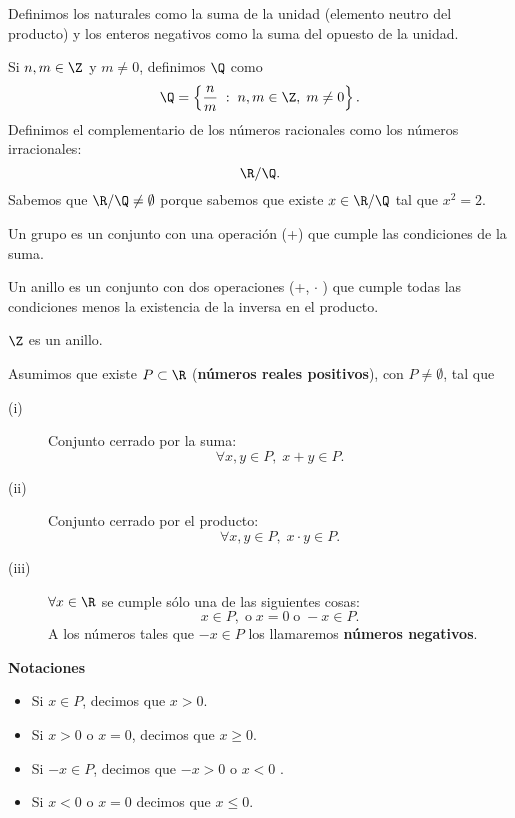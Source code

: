 Definimos los naturales como la suma de la unidad (elemento neutro del producto) y los enteros negativos como la suma del opuesto de la unidad.

\begin{fdefinition}[]
\normalfont Si $\displaystyle n, m \in \Z $ y $\displaystyle m \neq 0 $, definimos $\displaystyle \Q $ como 
\[ \Q = \left\{ \frac{n}{m}\; : \; n,m \in \Z, \; m\neq0 \right\}  .\]
Definimos el complementario de los números racionales como los números irracionales:
\[\R/\Q .\]
Sabemos que $\displaystyle \R/\Q \neq \emptyset $ porque sabemos que existe $\displaystyle x \in \R/\Q $ tal que $\displaystyle x^{2}=2 $.
\end{fdefinition}

\begin{fdefinition}[Grupo]
\normalfont Un grupo es un conjunto con una operación (+) que cumple las condiciones de la suma.
\end{fdefinition}
 \begin{fdefinition}[Anillo]
 \normalfont Un anillo es un conjunto con dos operaciones (+, $\displaystyle \cdot $ ) que cumple todas las condiciones menos la existencia de la inversa en el producto.
 \end{fdefinition}

\begin{eg}
\normalfont 
$\displaystyle \Z $ es un anillo. 
\end{eg}

\begin{fdefinition}
\normalfont Asumimos que existe $\displaystyle P \subset \R $ (\textbf{números reales positivos}), con $\displaystyle P \neq \emptyset $, tal que 
\begin{description}
\item[(i)] Conjunto cerrado por la suma:
	\[\forall x, y \in P, \; x+y \in P  .\]
\item[(ii)] Conjunto cerrado por el producto:
	\[\forall x, y \in P, \; x \cdot y \in P.\]
\item[(iii)] $\displaystyle \forall x \in \R $ se cumple sólo una de las siguientes cosas:
	\[ x\in P, \; \text{o}\; x = 0\; \text{o}\; -x\in P.\]
A los números tales que $\displaystyle -x \in P $ los llamaremos \textbf{números negativos}. 
\end{description}
\end{fdefinition}

\textbf{Notaciones} 
\begin{itemize}
\item Si $\displaystyle x \in P $, decimos que $\displaystyle x>0 $. 
\item Si $\displaystyle x>0 $ o $\displaystyle x = 0 $, decimos que $\displaystyle x \geq 0 $.
\item Si $\displaystyle -x \in P $, decimos que $\displaystyle -x >0 $ o $\displaystyle x <0 $ . 
\item Si $\displaystyle x<0 $ o $\displaystyle x = 0 $ decimos que $\displaystyle x \leq 0 $.
\end{itemize}

